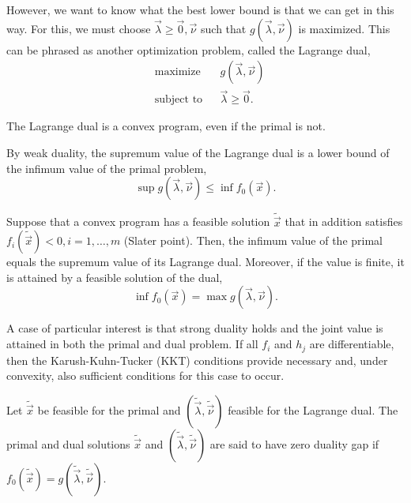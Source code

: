 However, we want to know what the best lower bound is that we can get in this way. For this, we
must choose $\vec{\lambda} \geq \vec{0}, \vec{\nu}$ such that $g(\vec{\lambda},\vec{\nu})$ is
maximized. This can be phrased as another optimization problem, called the Lagrange dual, \[
    \begin{aligned}
         & \text{maximize}   &  & g(\vec{\lambda},\vec{\nu})  \\
         & \text{subject to} &  & \vec{\lambda} \geq \vec{0}.
    \end{aligned}
\]

\begin{observation}
    The Lagrange dual is a convex program, even if the primal is not.
\end{observation}

\begin{observation}
    By weak duality, the supremum value of the Lagrange dual is a lower bound of the infimum value of the primal problem, \[
        \sup g(\vec{\lambda}, \vec{\nu}) \leq \inf f_0(\vec{x}).
    \]
\end{observation}

\begin{theorem}
    Suppose that a convex program has a feasible solution $\tilde{\vec{x}}$ that in addition satisfies
    $f_i(\tilde{\vec{x}}) < 0, i = 1,\ldots,m$ (Slater point). Then, the infimum value of the primal
    equals the supremum value of its Lagrange dual. Moreover, if the value is finite, it is attained
    by a feasible solution of the dual, \[
        \inf f_0(\vec{x}) = \max g(\vec{\lambda},\vec{\nu}).
    \]
\end{theorem}

A case of particular interest is that strong duality holds and the joint value is attained in both
the primal and dual problem. If all $f_i$ and $h_j$ are differentiable, then the
Karush-Kuhn-Tucker (KKT) conditions provide necessary and, under convexity, also sufficient
conditions for this case to occur.


\begin{definition}
    Let $\tilde{\vec{x}}$ be feasible for the primal and $(\tilde{\vec{\lambda}},\tilde{\vec{\nu}})$
    feasible for the Lagrange dual. The primal and dual solutions $\tilde{\vec{x}}$ and
    $(\tilde{\vec{\lambda}},\tilde{\vec{\nu}})$ are said to have zero duality gap if
    $f_0(\tilde{\vec{x}}) = g(\tilde{\vec{\lambda}}, \tilde{\vec{\nu}})$.
\end{definition}


